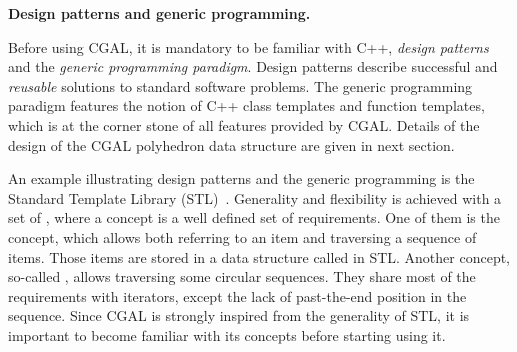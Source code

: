 
\noindent \textbf{Design patterns and generic programming.}

Before using CGAL, it is mandatory to be familiar with C++,
\emph{design patterns} and the \emph{generic programming paradigm}. 
Design patterns \cite{Gamma:1995:DP} describe successful and
\emph{reusable} solutions to standard software problems.  The generic
programming paradigm \cite{Alexandrescu:2001:MCD} features the notion
of C++ class templates and function templates, which is at the corner
stone of all features provided by CGAL. Details of the design of the
CGAL polyhedron data structure are given in next section.

An example illustrating design patterns and the generic programming is
the Standard Template Library (STL)~\cite{ms-stl-96}. Generality and
flexibility is achieved with a set of , where a
concept is a well defined set of requirements. One of them is the
 concept, which allows both referring to an item and
traversing a sequence of items. Those items are stored in a data
structure called  in STL. Another concept, so-called
, allows traversing some circular sequences. They
share most of the requirements with iterators, except the lack of
past-the-end position in the sequence. Since CGAL is strongly inspired
from the generality of STL, it is important to become familiar with
its concepts before starting using it.


